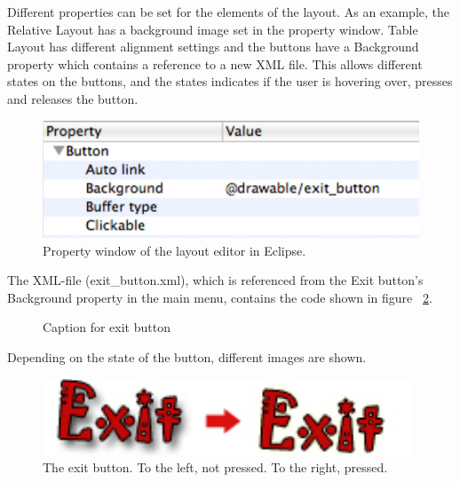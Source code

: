 Different properties can be set for the elements of the layout. As an example, the Relative Layout has a background image set in the property window. Table Layout has different alignment settings and the buttons have a Background property which contains a reference to a new XML file. This allows different states on the buttons, and the states indicates if the user is hovering over, presses and releases the button. 

\begin{figure}[h]
\begin{center}
\includegraphics[scale=1]{pics/chapters/chapter4/exitbuttonref}
\end{center}
\caption{Property window of the layout editor in Eclipse.}
\label{fig:propWindowLayoutEditorEclipse}
\end{figure}

The XML-file (exit\_button.xml), which is referenced from the Exit button's Background property in the main menu, contains the code shown in figure ~\ref{fig:codeExXMLExitButton}.
\clearpage
\begin{figure}[htb]

\begin{small}

\end{small}

\caption{Caption for exit button}
\label{fig:codeExXMLExitButton}
\end{figure}

Depending on the state of the button, different images are shown.

\begin{figure}[h]

\begin{center}
\includegraphics[scale=1]{pics/chapters/chapter4/exitbutton}
\end{center}

\caption{The exit button. To the left, not pressed. To the right, pressed.}
\label{fig:exitButtonPressed}
\end{figure}

